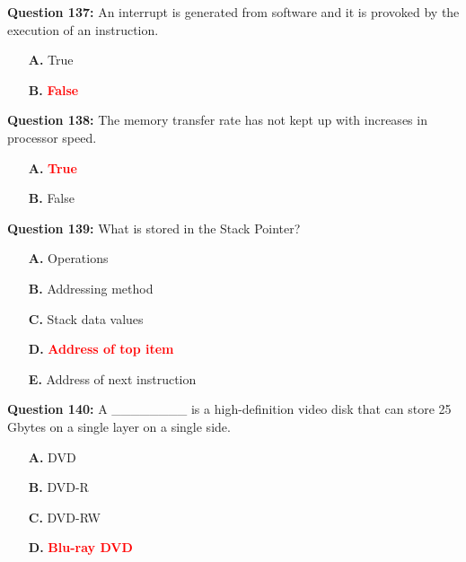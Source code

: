 \documentclass[12pt,a4paper]{article}
\begin{document}
\vspace{0.5cm}

\textbf{Question 137:} An interrupt is generated from software and it is provoked by the execution of an instruction.

\begin{itemize}
    \item[\textbf{A.}] True
    \item[\textbf{B.}] \textcolor{red}{\textbf{False}}
\end{itemize}

\vspace{0.5cm}

\textbf{Question 138:} The memory transfer rate has not kept up with increases in processor speed.

\begin{itemize}
    \item[\textbf{A.}] \textcolor{red}{\textbf{True}}
    \item[\textbf{B.}] False
\end{itemize}

\vspace{0.5cm}

\textbf{Question 139:} What is stored in the Stack Pointer?

\begin{itemize}
    \item[\textbf{A.}] Operations
    \item[\textbf{B.}] Addressing method
    \item[\textbf{C.}] Stack data values
    \item[\textbf{D.}] \textcolor{red}{\textbf{Address of top item}}
    \item[\textbf{E.}] Address of next instruction
\end{itemize}

\vspace{0.5cm}

\textbf{Question 140:} A ________ is a high-definition video disk that can store 25 Gbytes on a single layer on a single side.

\begin{itemize}
    \item[\textbf{A.}] DVD
    \item[\textbf{B.}] DVD-R
    \item[\textbf{C.}] DVD-RW
    \item[\textbf{D.}] \textcolor{red}{\textbf{Blu-ray DVD}}
\end{itemize}
\end{document}
